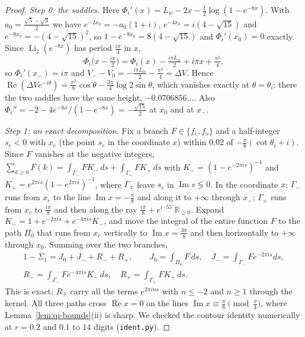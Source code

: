 \documentclass[11pt]{article}
\theoremstyle{plain}
\theoremstyle{definition}
\theoremstyle{remark}
\newcommand{\R}{\mathbb{R}}
\theoremstyle{plain}\newtheorem*{maintheorem}{Main Theorem}
\begin{document}
\begin{proof}
\emph{Step 0: the saddles.} Here $\Phi_i'(x)=L_w-2x-\frac12\log(1-e^{-8x})$. With $a_0=\frac{\sqrt5-\sqrt3}2$
we have $e^{-2x_0}=-a_0(1+i)$, $e^{-4x_0}=i(4-\sqrt{15})$ and $e^{-8x_0}=-(4-\sqrt{15})^2$, so
$1-e^{-8x_0}=8(4-\sqrt{15})$ and $\Phi_i'(x_0)=0$ exactly. Since $\operatorname{Li}_2(e^{-8x})$ has period
$\frac{i\pi}4$ in $x$,
\[
   \Phi_i\bigl(x-\tfrac{i\pi}2\bigr)=\Phi_i(x)-\tfrac{i\pi L_w}2+i\pi x+\tfrac{\pi^2}4 ,
\]
so $\Phi_i'(x_-)=i\pi$ and $V_--V_0=-\frac{i\pi L_w}2-\frac{\pi^2}4=\Delta V$. Hence
$\operatorname{Re}(\Delta Ve^{-i\theta})=\frac{\pi^2}8\cos\theta-\frac{3\pi}4\log2\sin\theta$, which vanishes exactly at
$\theta=\theta_i$: there the two saddles have the same height, $-0.0706856\ldots$. Also
$\Phi_i''=-2-4e^{-8x}/(1-e^{-8x})=-\frac{\sqrt{15}}2$ at $x_0$ and at $x_-$.

\emph{Step 1: an exact decomposition.} Fix a branch $F\in\{f_e,f_o\}$ and a half-integer $s_c<0$ with
$x_c$ (the point $s_c$ in the coordinate $x$) within $0.02$ of $-\frac\pi8(\cot\theta_i+i)$. Since $F$
vanishes at the negative integers, $\sum_{k\ge0}F(k)=\int_{\Gamma_-}FK_-\,ds+\int_{\Gamma_+}FK_+\,ds$ with
$K_-=(1-e^{-2\pi is})^{-1}$ and $K_+=e^{2\pi is}(1-e^{2\pi is})^{-1}$, where $\Gamma_\mp$ leave $s_c$ in
$\operatorname{Im}s\lessgtr0$. In the coordinate $x$: $\Gamma_-$ runs from $x_c$ to the line
$\operatorname{Im}x=-\frac\pi8$ and along it to $+\infty$ through $x_-$; $\Gamma_+$ runs from $x_c$ to
$\frac{i\pi}8$ and then along the ray $\frac{i\pi}8+e^{i\cdot55^\circ}\R_{\ge0}$. Expand
$K_-=1+e^{-2\pi is}+e^{-4\pi is}K_-$, and move the integral of the entire function $F$ to the path $\Pi_0$
that runs from $x_c$ vertically to $\operatorname{Im}x=\frac{3\pi}8$ and then horizontally to $+\infty$
through $x_0$. Summing over the two branches,
\begin{gather*}
   1-\Sigma_1=J_0+J_-+R_-+R_+,\qquad J_0=\int_{\Pi_0}F\,ds,\quad J_-=\int_{\Gamma_-}Fe^{-2\pi is}ds,\\
   R_-=\int_{\Gamma_-}Fe^{-4\pi is}K_-\,ds,\quad R_+=\int_{\Gamma_+}FK_+\,ds .
\end{gather*}
This is exact; $R_\mp$ carry all the terms $e^{2\pi ins}$ with $n\le-2$ and $n\ge1$ through the kernel.
All three paths cross $\operatorname{Re}x=0$ on the lines $\operatorname{Im}x\equiv\frac\pi8\pmod{\frac\pi4}$,
where Lemma~\ref{lem:qi-bounds}\textup{(ii)} is sharp. We checked the contour identity numerically at
$r=0.2$ and $0.1$ to $14$ digits (\texttt{ident.py}).


\end{proof}
\end{document}

